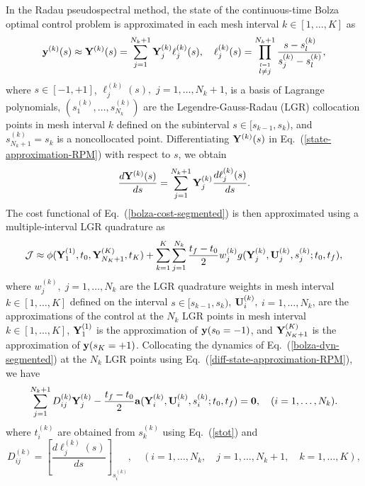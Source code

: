 \documentclass[prodmode,acmtecs]{acmsmall}
\begin{document}
In the Radau pseudospectral method, the state of the continuous-time
Bolza optimal control problem is approximated in each mesh interval
$k\in[1,\ldots,K]$ as 
\begin{equation}\label{state-approximation-RPM}
 \bfy^{(k)}(s)  \approx \bfY^{(k)}(s) = \sum_{j=1}^{N_k+1} \bfY_{j}^{(k)}
 \ell_{j}^{(k)}(s), \quad  \ell_{j}^{(k)}(s) = \prod_{\stackrel{l=1}{l\neq j}}^{N_k+1}\frac{s-s_{l}^{(k)}}{s_{j}^{(k)}-s_{l}^{(k)}}, 
\end{equation} 
where $s\in[-1,+1]$, $\ell_{j}^{(k)}(s),$ $j=1,\ldots,N_k+1$, is a
basis of Lagrange polynomials, $(s_1^{(k)},\ldots,s_{N_k}^{(k)})$ are the
Legendre-Gauss-Radau\cite{Abramowitz1} (LGR) collocation points
in mesh interval $k$ defined on the subinterval $s\in[s_{k-1},s_k)$, and
$s_{N_k+1}^{(k)}=s_k$ is a noncollocated point.  Differentiating
$\mathbf{Y}^{(k)}(s)$ in Eq.~(\ref{state-approximation-RPM}) with respect
to $s$, we obtain
\begin{equation}\label{diff-state-approximation-RPM}
  \frac{d\bfY^{(k)}(s)}{ds} = \sum_{j=1}^{N_k+1}\bfY_{j}^{(k)}\frac{d\ell_j^{(k)}(s)}{ds}.
\end{equation}
The cost functional of Eq.~(\ref{bolza-cost-segmented}) is then
approximated using a multiple-interval LGR quadrature as  
\begin{equation}\label{RPM-cost}
  \mathcal{J} \approx \phi(\bfY_{1}^{(1)},t_0,\bfY_{N_K+1}^{(K)},t_K)  +
  \sum_{k=1}^{K} \sum_{j=1}^{N_k}  \frac{t_f-t_0}{2} 
  w_{j}^{(k)} g(\bfY_{j}^{(k)},\bfU_{j}^{(k)},s_{j}^{(k)};t_0,t_f),
\end{equation}
where $w_j^{(k)},\;j=1,\ldots,N_k$ are the LGR quadrature
weights\cite{Abramowitz1} in mesh interval $k\in[1,\ldots,K]$ defined 
on the interval $s\in[s_{k-1},s_k)$, $\textbf{U}_i^{(k)},$ $i=1,\ldots,N_k$,
are the approximations of  the control at the $N_k$ LGR points in mesh
interval $k\in[1,\ldots,K]$, $\mathbf{Y}_1^{(1)}$ is the approximation of
$\mathbf{y}(s_0=-1)$, and $\mathbf{Y}_{N_K+1}^{(K)}$ is the approximation of $\mathbf{y}(s_K=+1)$.
Collocating the dynamics of Eq.~(\ref{bolza-dyn-segmented}) at the
$N_k$ LGR points using Eq.~(\ref{diff-state-approximation-RPM}), we have
\begin{equation}\label{RPM-collocation-conditions}
  \sum_{j=1}^{N_k+1}D_{ij}^{(k)} \bfY_j^{(k)} - \frac{t_f-t_0}{2} \bfa(\bfY_i^{(k)},\bfU_i^{(k)},s_i^{(k)};t_0,t_f) = \bfzero, \quad (i=1,\ldots,N_k).  
\end{equation}
where $t_i^{(k)}$ are obtained from $s_k^{(k)}$ using Eq.~(\ref{stot})
and 
\begin{equation}\label{Radau-differentiation-matrix}
  D_{ij}^{(k)} = \left[\frac{d\ell_j^{(k)}(s)}{ds}\right]_{s_i^{(k)}}, \quad
   (i=1,\ldots,N_k, \quad j=1,\ldots,N_k+1,\quad k=1,\ldots,K),
\end{equation}
\end{document}
